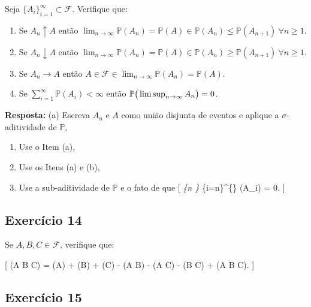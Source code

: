 \documentclass[
  letterpaper,
  DIV=11,
  numbers=noendperiod]{scrartcl}
\begin{document}
Seja \(\{A_{i}\}_{i=1}^{\infty}\subset\mathscr{F}\). Verifique que:

\begin{enumerate}
\def\labelenumi{(\alph{enumi})}
\item
  Se \(A_{n}\uparrow A\) então
  \(\lim_{n\to\infty}\mathbb{P}(A_{n})=\mathbb{P}(A)\in\mathbb{P}(A_{n})\leqslant \mathbb{P}(A_{n+1})\ \forall n\geqslant 1\).
\item
  Se \(A_{n}\downarrow A\) então
  \(\lim_{n\to\infty}\mathbb{P}(A_{n})=\mathbb{P}(A)\in\mathbb{P}(A_{n})\geqslant \mathbb{P}(A_{n+1})\ \forall n\geqslant 1\).
\item
  Se \(A_{n}\to A\) então
  \(A\in\mathscr{F}\in\lim_{n\to\infty}\mathbb{P}(A_{n})=\mathbb{P}(A)\).
\item
  Se \(\sum_{i=1}^{\infty}\mathbb{P}(A_{i})<\infty\) então
  \(\mathbb{P}\big{(}\limsup_{n\to\infty}A_{n}\big{)}=0\).
\end{enumerate}

\textbf{Resposta:} (a) Escreva \(A_n\) e \(A\) como união disjunta de
eventos e aplique a \(\sigma\)-aditividade de \(\mathbb{P}\),

\begin{enumerate}
\def\labelenumi{(\alph{enumi})}
\setcounter{enumi}{1}
\item
  Use o Item (a),
\item
  Use os Itens (a) e (b),
\item
  Use a sub-aditividade de \(\mathbb{P}\) e o fato de que {[}
  \lim\emph{\{n \to \infty\} \sum}\{i=n\}\^{}\{\infty\} (A\_i)
  = 0. {]}
\end{enumerate}

\hypertarget{exercuxedcio-14}{%
\subsection{Exercício 14}\label{exercuxedcio-14}}

Se \(A, B, C \in \mathcal{F}\), verifique que:

{[} (A \cup B \cup C) = (A) + (B) +
(C) - (A \cap B) - (A \cap C) -
(B \cap C) + (A \cap B \cap C). {]}

\hypertarget{exercuxedcio-15}{%
\subsection{Exercício 15}\label{exercuxedcio-15}}
\end{document}
